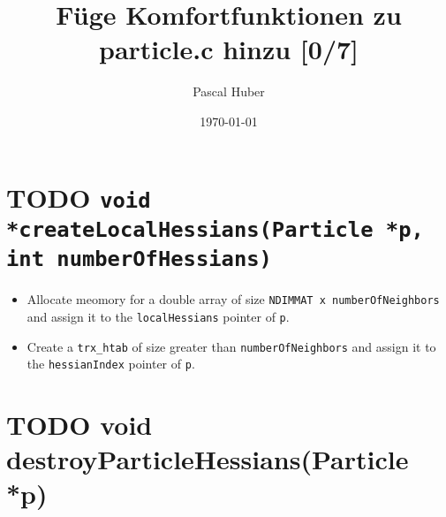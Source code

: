 \documentclass[a4paper]{article}
\title{Füge Komfortfunktionen zu particle.c hinzu [0/7]}
\author{Pascal Huber}
\date{\today}
\begin{document}
\maketitle

\setcounter{tocdepth}{3}
\tableofcontents
\vspace*{1cm}
\section{\textbf{TODO} \texttt{void *createLocalHessians(Particle *p, int numberOfHessians)}}
\label{sec-1}

\begin{itemize}
\item Allocate meomory for a double array of size \texttt{NDIMMAT x numberOfNeighbors}
  and assign it to the \texttt{localHessians} pointer of \texttt{p}.
\item Create a \texttt{trx\_htab} of size greater than \texttt{numberOfNeighbors} and assign it to the \texttt{hessianIndex} pointer of \texttt{p}.
\end{itemize}
\section{\textbf{TODO} void destroyParticleHessians(Particle *p)}
\label{sec-2}
\end{document}
